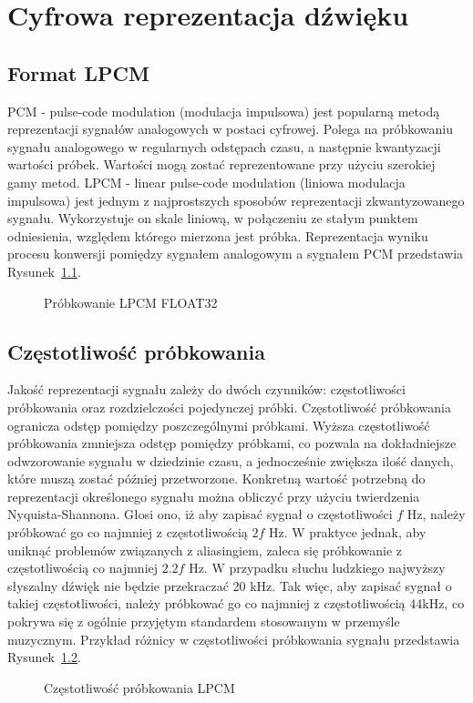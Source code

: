 \chapter{Cyfrowa reprezentacja dźwięku}

\section{Format LPCM}
PCM\cite{bib:PCM} - pulse-code modulation (modulacja impulsowa) jest popularną metodą reprezentacji sygnałów analogowych w postaci cyfrowej. Polega na próbkowaniu sygnału analogowego w regularnych odstępach czasu, a następnie kwantyzacji wartości próbek. Wartości mogą zostać reprezentowane przy użyciu szerokiej gamy metod. LPCM - linear pulse-code modulation (liniowa modulacja impulsowa) jest jednym z najprostszych sposobów reprezentacji zkwantyzowanego sygnału. Wykorzystuje on skale liniową, w połączeniu ze stałym punktem odniesienia, względem którego mierzona jest próbka. Reprezentacja wyniku procesu konwersji pomiędzy sygnałem analogowym a sygnałem PCM przedstawia Rysunek~\ref{fig:Próbkowanie LPCM FLOAT32}.
\begin{figure}[H]
    \centering
    \scalebox{1.0}{}
    \caption{Próbkowanie LPCM FLOAT32}
    \label{fig:Próbkowanie LPCM FLOAT32}
\end{figure}

\section{Częstotliwość próbkowania}
Jakość reprezentacji sygnału zależy do dwóch czynników: częstotliwości próbkowania oraz rozdzielczości pojedynczej próbki. Częstotliwość próbkowania ogranicza odstęp pomiędzy poszczególnymi próbkami. Wyższa częstotliwość próbkowania zmniejsza odstęp pomiędzy próbkami, co pozwala na dokładniejsze odwzorowanie sygnału w dziedzinie czasu, a jednocześnie zwiększa ilość danych, które muszą zostać później przetworzone. Konkretną wartość potrzebną do reprezentacji określonego sygnału można obliczyć przy użyciu twierdzenia Nyquista-Shannona\cite{bib:Nyquist-Shannon}. Głosi ono, iż aby zapisać sygnał o częstotliwości $f$ Hz, należy próbkować go co najmniej z częstotliwością $2f$ Hz. W praktyce jednak, aby uniknąć problemów związanych z aliasingiem, zaleca się próbkowanie z częstotliwością co najmniej $2.2f$ Hz. W przypadku słuchu ludzkiego najwyższy słyszalny dźwięk nie będzie przekraczać 20 kHz. Tak więc, aby zapisać sygnał o takiej częstotliwości, należy próbkować go co najmniej z częstotliwością 44kHz, co pokrywa się z ogólnie przyjętym standardem stosowanym w przemyśle muzycznym. Przykład różnicy w częstotliwości próbkowania sygnału przedstawia Rysunek~\ref{fig:Częstotliwość próbkowania LPCM}.
\begin{figure}[H]
    \centering
    \scalebox{1.0}{}
    \caption{Częstotliwość próbkowania LPCM}
    \label{fig:Częstotliwość próbkowania LPCM}
\end{figure}


